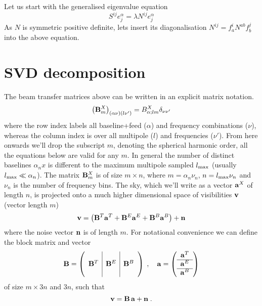 \documentclass[onecolumn]{revtex4}
\begin{document}
Let us start with the generalised eigenvalue equation
\begin{equation}
S^{ij} e_j^\alpha = \lambda N^{ij} e_j^\alpha
\end{equation}
As $N$ is symmetric positive definite, lets insert its diagonalisation $N^{ij} =
f^i_a N^{ab} f^j_b$ into the above equation.

\section{SVD decomposition}

The beam transfer matrices above can be written in an explicit matrix notation.
\begin{equation}
\left(\mathbf{B}_m^X\right)_{(\alpha \nu) (l \nu')} = B_{\alpha;lm}^X \delta_{\nu \nu'}
\end{equation}
where the row index labels all baseline+feed ($\alpha$) and frequency
combinations ($\nu$), whereas the column index is over all multipole ($l$) and
frequencies ($\nu'$). From here onwards we'll drop the subscript $m$, denoting
the spherical harmonic order, all the equations below are valid for any $m$. In
general the number of distinct baselines $\alpha_nx$ is different to the maximum
multipole sampled $l_{\text{max}}$ (usually $l_{\text{max}} \ll \alpha_n$). The matrix
$\mathbf{B}_m^X$ is of size $m \times n$, where $m = \alpha_n \nu_n$, $n = l_{\text{max}}
\nu_n$ and $\nu_n$ is the number of frequency bins. The sky, which we'll write
as a vector $\mathbf{a}^X$ of length $n$, is projected onto a much higher dimensional
space of visibilities $\mathbf{v}$ (vector length $m$)
\begin{equation}
\mathbf{v} = \left(\mathbf{B}^T \mathbf{a}^T + \mathbf{B}^E \mathbf{a}^E + \mathbf{B}^B \mathbf{a}^B \right) + \mathbf{n}
\end{equation}
where the noise vector $\mathbf{n}$ is of length $m$. For notational convenience we can
define the block matrix and vector
\begin{equation}
\mathbf{B} = \left(\begin{array}{c|c|c} & & \\ \mathbf{B}^T & \mathbf{B}^E & \mathbf{B}^B \\ &
    &\end{array}\right)
\;, \quad
\mathbf{a} = \left(\begin{array}{c} \mathbf{a}^T \\ \hline \mathbf{a}^E \\ \hline
    \mathbf{a}^B\end{array}\right)
\end{equation}
of size $m \times 3 n$ and $3 n$, such that
\begin{equation}
\label{eq:matnot}
\mathbf{v} = \mathbf{B}\, \mathbf{a} + \mathbf{n} \; .
\end{equation}
\end{document}
